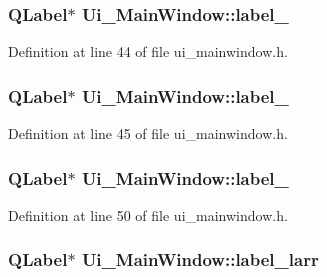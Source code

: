 \subsubsection[{\texorpdfstring{label\+\_\+2}{label_2}}]{\setlength{\rightskip}{0pt plus 5cm}Q\+Label$\ast$ Ui\+\_\+\+Main\+Window\+::label\+\_}\hypertarget{class_ui___main_window_a2e2516d755e4dd53fc905dabddf2738a}{}\label{class_ui___main_window_a2e2516d755e4dd53fc905dabddf2738a}


Definition at line 44 of file ui\+\_\+mainwindow.\+h.

\subsubsection[{\texorpdfstring{label\+\_\+3}{label_3}}]{\setlength{\rightskip}{0pt plus 5cm}Q\+Label$\ast$ Ui\+\_\+\+Main\+Window\+::label\+\_}\hypertarget{class_ui___main_window_a0376fd90247280e7c7957cc70628708c}{}\label{class_ui___main_window_a0376fd90247280e7c7957cc70628708c}


Definition at line 45 of file ui\+\_\+mainwindow.\+h.

\subsubsection[{\texorpdfstring{label\+\_\+4}{label_4}}]{\setlength{\rightskip}{0pt plus 5cm}Q\+Label$\ast$ Ui\+\_\+\+Main\+Window\+::label\+\_}\hypertarget{class_ui___main_window_a78c7e10730b43c6700cd7216911ed76a}{}\label{class_ui___main_window_a78c7e10730b43c6700cd7216911ed76a}


Definition at line 50 of file ui\+\_\+mainwindow.\+h.

\subsubsection[{\texorpdfstring{label\+\_\+larr}{label_larr}}]{\setlength{\rightskip}{0pt plus 5cm}Q\+Label$\ast$ Ui\+\_\+\+Main\+Window\+::label\+\_\+larr}\hypertarget{class_ui___main_window_a32587f1e879f5b685d375d2daa20f7a6}{}\label{class_ui___main_window_a32587f1e879f5b685d375d2daa20f7a6}


